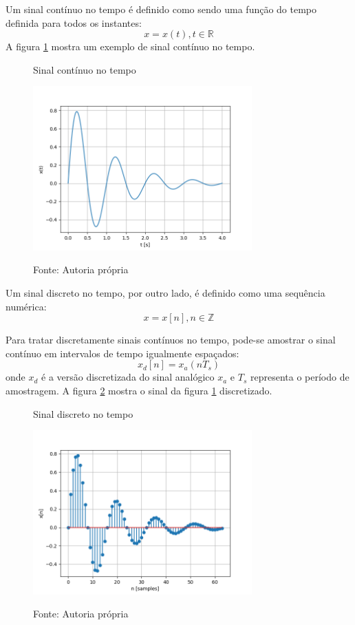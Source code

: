 \documentclass[12pt,a4paper]{report}
\begin{document}
  Um sinal contínuo no tempo é definido como sendo uma função do tempo definida para todos os instantes:
  \begin{equation}
    x = x(t), t \in \mathbb{R}
  \end{equation}
  A figura \ref{fig:continuous} mostra um exemplo de sinal contínuo no tempo.
  \begin{figure}[H]
    \caption{Sinal contínuo no tempo}
    \centering
    \includegraphics[width=0.75\textwidth]{continuous}
    \label{fig:continuous}
    \caption*{Fonte: Autoria própria}
  \end{figure}

  Um sinal discreto no tempo, por outro lado, é definido como uma sequência numérica:
  \begin{equation}
    x = x[n], n \in \mathbb{Z}
  \end{equation}

  Para tratar discretamente sinais contínuos no tempo, pode-se amostrar o sinal contínuo em intervalos de tempo
  igualmente espaçados:
  \begin{equation}
    x_d[n] = x_a(n T_s)
  \end{equation}
  onde $x_d$ é a versão discretizada do sinal analógico $x_a$ e $T_s$ representa o período de amostragem.
  A figura \ref{fig:discrete} mostra o sinal da figura \ref{fig:continuous} discretizado.
  \begin{figure}[H]
    \caption{Sinal discreto no tempo}
    \centering
    \includegraphics[width=0.75\textwidth]{discrete}
    \label{fig:discrete}
    \caption*{Fonte: Autoria própria}
  \end{figure}
\end{document}
